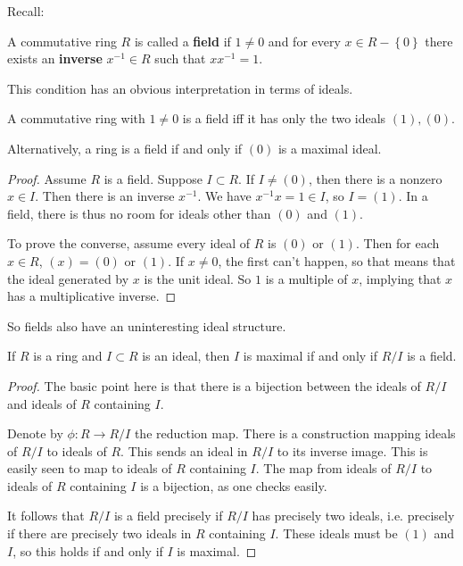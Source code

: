 Recall:

\begin{definition} 
A commutative ring $R$ is called a  \textbf{field} if $1 \neq 0$ and for every $x \in R -
\left\{0\right\}$ there exists an \textbf{inverse} $x^{-1} \in R$ such that $xx^{-1} =
1$.


\end{definition}


This condition has an obvious interpretation in terms of ideals.
\begin{proposition} 
A commutative ring with $1 \neq 0$ is a field iff it has only the two ideals $(1),
(0)$.
\end{proposition} 

Alternatively, a ring is a field if and only if $(0)$ is a maximal ideal.

\begin{proof} 
Assume $R$ is a field.  Suppose $I \subset R$.  If $I \neq (0)$, then there is
a nonzero $x \in I$. Then there is an inverse $x^{-1}$. We have $x^{-1} x =1
\in I$, so $I = (1)$.
In a field, there is thus 	no room for ideals other than $(0)$ and $(1)$.

To prove the converse, assume every ideal of $R$ is $(0)$ or $(1)$. Then for
each $x \in R$, $(x) = (0)$ or $(1)$. If $x \neq 0$, the first can't happen, so
that means that the ideal generated by $x$ is the unit ideal. So $1$ is a
multiple of $x$, implying that $x$ has a multiplicative inverse.
\end{proof} 

So fields also have an uninteresting ideal structure.

\begin{corollary} \label{maximalfield}
If $R$ is a ring and $I \subset R$ is an ideal, then $I$ is maximal if and only
if $R/I$ is a field.
\end{corollary} 

\begin{proof}
The basic point here is that there is a bijection between the ideals of $R/I$
and ideals of $R$ containing $I$. 

Denote  by $\phi: R \to R/I$ the reduction map. There is a
construction mapping ideals of $R/I$ to ideals of $R$. This sends an ideal in
$R/I$ to
its inverse image.  This is easily seen to map to ideals of $R$ containing $I$.
The map from ideals of $R/I$ to ideals of $R$ containing $I$ is a bijection,
as one checks easily.

It follows that $R/I$ is a field precisely if
$R/I$ has precisely two ideals, i.e. precisely if there are precisely two
ideals in $R$ containing $I$. These ideals must be $(1)$ and $I$, so this
holds if and only if $I$ is maximal.
\end{proof} 

